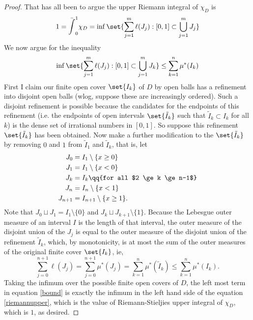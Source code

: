 \documentclass[onesided]{ccg-pset}
\begin{document}
\begin{enumerate}
\begin{proof}
    That has all been to argue the upper Riemann integral of $\chi_D$ is 
    \begin{equation*}
        1 = \bar\int_0^1 \chi_D  = \inf\set{\sum_{j=1}^m \ell(J_j) : [0,1] \subset \bigcup_{j=1}^m J_j} 
    \end{equation*}
    We now argue for the inequality 
    \begin{equation}
        \label{riemannupper}
        \inf\set{\sum_{j=1}^m \ell(J_j) : [0,1] \subset \bigcup_{j=1}^m J_k} \le \sum_{k=1}^n\mu^*(I_k)
    \end{equation}
    First I claim our finite open cover $\set{I_k}$ of $D$ by open balls has a refinement into disjoint open balls (wlog, suppose these are increasingly ordered). Such a disjoint refinement is possible because the candidates for the endpoints of this refinement (i.e. the endpoints of open intervals $\set{\tilde I_k}$ such that $\tilde I_k \subset I_k$ for all $k$) is the dense set of irrational numbers in $[0,1]$. So suppose this refinement $\set{\tilde I_k}$ has been obtained. Now make a further modification to the $\set{\tilde I_k}$ by removing $0$ and $1$ from $\tilde I_1$ and $\tilde I_k$, that is, let
    \begin{align*}
        J_0 &= I_1 \setminus \{x \ge 0\}\\
        J_1 &= I_1 \setminus \{x  < 0\}\\
        J_k &= I_k \qq{for all $2 \ge k \ge n-1$}\\
        J_n &= I_n \setminus \{x  < 1\}\\
        J_{n+1} &= I_{n+1} \setminus \{x  \ge 1\}.
    \end{align*}
    Note that $J_0 \sqcup J_1 = I_1 \setminus \{0\}$ and $J_k \sqcup J_{k+1} \setminus \{1\}$.
    Because the Lebesgue outer measure of an interval $I$ is the length of that interval, the outer measure of the disjoint union of the $J_j$ is equal to the outer measure of the disjoint union of the refinement $\tilde I_k$, which, by monotonicity, is at most the sum of the outer measures of the original finite cover $\set{I_k}$, ie,
    \begin{equation}
        \label{bound}
        \sum\limits_{j=0}^{n+1}\ell(J_j) = \sum\limits_{j=0}^{n+1}\mu^*(J_j) = \sum\limits_{k=1}^{n} \mu^*(\tilde I_k) \le \sum\limits_{k=1}^{n}\mu^*(I_k).
    \end{equation}
    Taking the infimum over the possible finite open covers of $D$, the left most term in equation \eqref{bound} is exactly the infimum in the left hand side of the equation \ref{riemannupper}, which is the value of Riemann-Stieljies upper integral of $\chi_D$, which is $1$, as desired.

\end{proof}
\end{enumerate}
\end{document}
